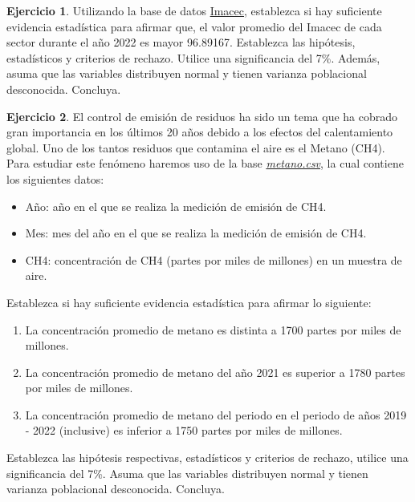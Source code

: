 \documentclass[
  11pt,
]{book}
\providecommand{\tightlist}{%
  \setlength{\itemsep}{0pt}\setlength{\parskip}{0pt}}
\theoremstyle{definition}
\theoremstyle{definition}
\theoremstyle{definition}
\newtheorem{exercise}{Ejercicio}[chapter]
\theoremstyle{definition}
\theoremstyle{remark}
\begin{document}
\begin{exercise}
Utilizando la base de datos \hyperref[Imacec]{Imacec}, establezca si hay suficiente evidencia estadística para afirmar que, el valor promedio del Imacec de cada sector durante el año 2022 es mayor 96.89167. Establezca las hipótesis, estadísticos y criterios de rechazo. Utilice una significancia del 7\%. Además, asuma que las variables distribuyen normal y tienen varianza poblacional desconocida. Concluya.
\end{exercise}

\begin{exercise}
\protect\hypertarget{exr:metano}{}\label{exr:metano}El control de emisión de residuos ha sido un tema que ha cobrado gran importancia en los últimos 20 años debido a los efectos del calentamiento global. Uno de los tantos residuos que contamina el aire es el Metano (CH4). Para estudiar este fenómeno haremos uso de la base \href{https://raw.githubusercontent.com/Dfranzani/Bases-de-datos-para-cursos/main/2022-2/Estad\%C3\%ADstica\%202/metano.csv}{\emph{metano.csv}}, la cual contiene los siguientes datos:

\begin{itemize}
\tightlist
\item
  Año: año en el que se realiza la medición de emisión de CH4.
\item
  Mes: mes del año en el que se realiza la medición de emisión de CH4.
\item
  CH4: concentración de CH4 (partes por miles de millones) en un muestra de aire.
\end{itemize}

Establezca si hay suficiente evidencia estadística para afirmar lo siguiente:

\begin{enumerate}
\def\labelenumi{\arabic{enumi}.}
\tightlist
\item
  La concentración promedio de metano es distinta a 1700 partes por miles de millones.
\item
  La concentración promedio de metano del año 2021 es superior a 1780 partes por miles de millones.
\item
  La concentración promedio de metano del periodo en el periodo de años 2019 - 2022 (inclusive) es inferior a 1750 partes por miles de millones.
\end{enumerate}

Establezca las hipótesis respectivas, estadísticos y criterios de rechazo, utilice una significancia del 7\%. Asuma que las variables distribuyen normal y tienen varianza poblacional desconocida. Concluya.
\end{exercise}
\end{document}
